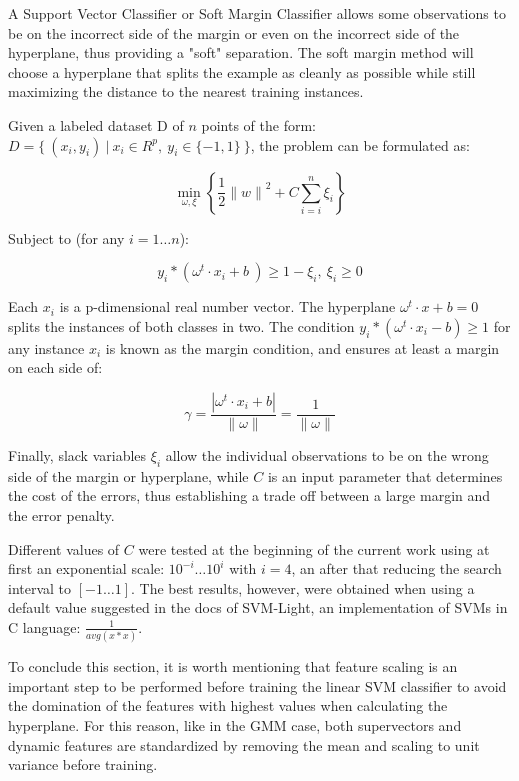 A Support Vector Classifier or Soft Margin Classifier allows some observations to be on the
incorrect side of the margin or even on the incorrect side of the hyperplane, thus providing
a "soft" separation. The soft margin method will choose a hyperplane that splits the example
as cleanly as possible while still maximizing the distance to the nearest training instances.

Given a labeled dataset D of $n$ points
of the form: $D=\{ \ (x_{i}, y_{i}) \ | \ x_{i} \in R^{p}, \ y_{i} \in \{-1, 1\} \ \}$, the
problem can be formulated as:

\begin{equation}
  \displaystyle \min_{\omega, \xi} \left\{ \frac{1}{2}{\| w \|}^{2} + C \sum_{i=i}^{n}\xi_{i} \right\}
\end{equation}

Subject to (for any $i = 1 \ldots n$):

\begin{equation}
  y_{i}*(\omega^{t} \cdot x_{i} + b \ ) \geq 1 - \xi_{i}, \ \xi_{i} \geq 0
\end{equation}

Each $x_{i}$ is a p-dimensional real number vector.
The hyperplane $\omega^{t} \cdot x + b = 0$ splits the instances of both classes in two.
The condition $y_{i}*(\omega^{t} \cdot x_{i} - b) \geq 1$ for any instance $x_{i}$ is
known as the margin condition, and ensures at least a margin on each side of:

\begin{equation}
  \gamma = \frac{ |\omega^{t} \cdot x_{i} + b| }{ \| \omega \| } = \frac{1}{\| \omega \|}
\end{equation}

Finally, slack variables $\xi_{i}$ allow the individual observations to be
on the wrong side of the
margin or hyperplane, while $C$ is an input parameter that determines the cost of
the errors, thus establishing a trade off between a large margin and the error penalty.

Different values of $C$ were tested at the beginning of the
current work using at first an exponential scale:
$10^{-i} \ldots 10^{i}$ with $i=4$, an after that reducing the search interval to
$[-1 \ldots 1]$. The best results, however, were obtained when using a default value
suggested in the docs of SVM-Light, an implementation of SVMs in C language: $\frac{1}{avg(x*x)}$.

To conclude this section, it is worth mentioning that feature scaling is an important
step to be performed before training
the linear SVM classifier to avoid the domination of the features with highest values
when calculating the hyperplane. For this reason, like in the GMM case, both supervectors
and dynamic features are standardized by removing the mean and scaling to unit variance
before training.

